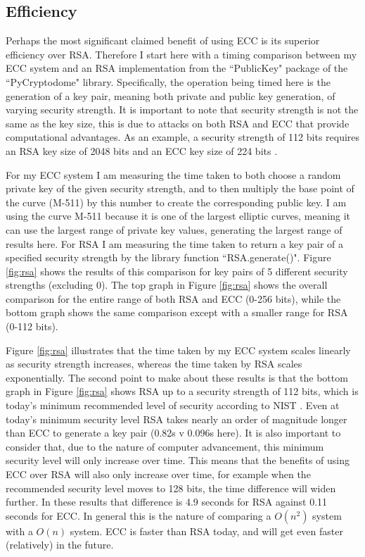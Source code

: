 \documentclass[12pt,a4paper]{article}
\begin{document}
\subsection{Efficiency} \noindent \label{Efficiency}
Perhaps the most significant claimed benefit of using ECC is its superior efficiency over RSA. 
Therefore I start here with a timing comparison between my ECC system and an RSA implementation 
from the ``PublicKey" package of the ``PyCryptodome" library. 
Specifically, the operation being timed here is the generation of a key pair, meaning both private and public key generation, 
of varying security strength. 
It is important to note that security strength is not the same as the key size, this is due to attacks on both RSA and ECC that provide computational advantages. 
As an example, a security strength of 112 bits requires an RSA key size of 2048 bits and an ECC key size of 224 bits \cite[p54-55]{barker2020recommendation}. 

For my ECC system I am measuring the time taken to both choose a random private key of the given security strength, 
and to then multiply the base point of the curve (M-511) by this number to create the corresponding public key. 
I am using the curve M-511 because it is one of the largest elliptic curves, 
meaning it can use the largest range of private key values, generating the largest range of results here. 
For RSA I am measuring the time taken to return a key pair of a specified security strength by the library function ``RSA.generate()". 
Figure \ref{fig:rsa} shows the results of this comparison for key pairs of 5 different security strengths (excluding 0). 
The top graph in Figure \ref{fig:rsa} shows the overall comparison for the entire range of both RSA and ECC (0-256 bits), 
while the bottom graph shows the same comparison except with a smaller range for RSA (0-112 bits). 

Figure \ref{fig:rsa} illustrates that the time taken by my ECC system scales linearly as security strength increases, 
whereas the time taken by RSA scales exponentially. 
The second point to make about these results is that the bottom graph in Figure \ref{fig:rsa} shows RSA up to a security strength of 112 bits, 
which is today's minimum recommended level of security according to NIST \cite[p54-55]{barker2020recommendation}. 
Even at today's minimum security level RSA takes nearly an order of magnitude longer than ECC to generate a key pair (0.82s v 0.096s here). 
It is also important to consider that, due to the nature of computer advancement, this minimum security level will only increase over time. 
This means that the benefits of using ECC over RSA will also only increase over time, 
for example when the recommended security level moves to 128 bits, the time difference will widen further. 
In these results that difference is 4.9 seconds for RSA against 0.11 seconds for ECC. 
In general this is the nature of comparing a $O(n^2)$ system with a $O(n)$ system. 
ECC is faster than RSA today, and will get even faster (relatively) in the future. 
\end{document}
